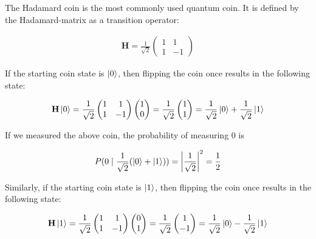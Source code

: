 The Hadamard coin is the most commonly used quantum coin. It is defined by the Hadamard-matrix as a transition operator:

\begin{align*}
  \mathbf{H} = \frac{1}{\sqrt{2}}\begin{pmatrix}
      1 & 1  \\
      1 & -1
    \end{pmatrix}
\end{align*}

If the starting coin state is $\ket{0}$, then flipping the coin once results in the following state:

\begin{align*}
 \mathbf{H}\ket{0} = \frac{1}{\sqrt{2}}\begin{pmatrix}
      1 & 1  \\
      1 & -1
    \end{pmatrix} \begin{pmatrix} 1 \\ 0 \end{pmatrix}
    = \frac{1}{\sqrt{2}} \begin{pmatrix} 1 \\ 1 \end{pmatrix} = \frac{1}{\sqrt{2}} \ket{0} + \frac{1}{\sqrt{2}} \ket{1}
\end{align*}

If we measured the above coin, the probability of measuring $0$ is

\begin{align*}
P(0 \mid \frac{1}{\sqrt{2}} (\ket{0} + \ket{1})) =
\left\lvert\frac{1}{\sqrt{2}}\right\rvert^2 =
\frac{1}{2}
\end{align*}

Similarly, if the starting coin state is $\ket{1}$, then flipping the coin once results in the following state:

\begin{align*}
   \mathbf{H}\ket{1} = \frac{1}{\sqrt{2}}\begin{pmatrix}
      1 & 1  \\
      1 & -1
    \end{pmatrix} \begin{pmatrix} 0 \\ 1 \end{pmatrix}
    = \frac{1}{\sqrt{2}} \begin{pmatrix} 1 \\ -1 \end{pmatrix} = \frac{1}{\sqrt{2}} \ket{0} - \frac{1}{\sqrt{2}} \ket{1}
\end{align*}

